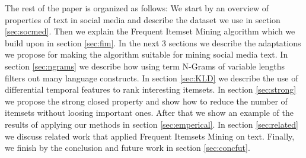 \documentclass{sig-alternate}
\begin{document}
The rest of the paper is organized as follows: We start by an overview of properties of text in social media and describe the dataset we use in section \ref{sec:socmed}. Then we explain the Frequent Itemset Mining algorithm which we build upon in section \ref{sec:fim}. 
In the next 3 sections we describe the adaptations we propose for making the algorithm suitable for mining social media text. In section \ref{sec:ngrams} we describe how using term N-Grams of variable lengths filters out many language constructs. In section \ref{sec:KLD} we describe the use of differential temporal features to rank interesting itemsets. In section \ref{sec:strong} we propose the strong closed property and show how to reduce the number of itemsets without loosing important ones. After that we show an example of the results of applying our methods in section \ref{sec:emperical}. In section \ref{sec:related} we discuss related work that applied Frequent Itemsets Mining on text. Finally, we finish by the conclusion and future work in section \ref{sec:concfut}.

\end{document}
